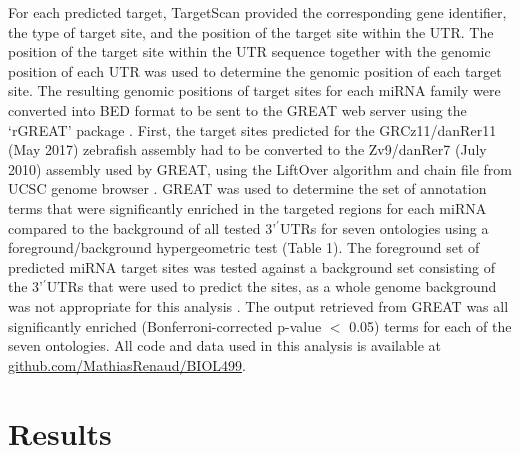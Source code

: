 \documentclass[12pt]{article}
\begin{document}
For each predicted target, TargetScan provided the corresponding gene identifier, the type of target site, and the position of the target site within the UTR. The position of the target site within the UTR sequence together with the genomic position of each UTR was used to determine the genomic position of each target site. The resulting genomic positions of target sites for each miRNA family were converted into BED format to be sent to the GREAT web server using the ‘rGREAT’ package \cite{gu2018}. First, the target sites predicted for the GRCz11/danRer11 (May 2017) zebrafish assembly had to be converted to the Zv9/danRer7 (July 2010) assembly used by GREAT, using the LiftOver algorithm and chain file from UCSC genome browser \cite{karolchik2003ucsc}. GREAT was used to determine the set of annotation terms that were significantly enriched in the targeted regions for each miRNA compared to the background of all tested 3’$^\prime$UTRs for seven ontologies using a foreground/background hypergeometric test (Table 1). The foreground set of predicted miRNA target sites was tested against a background set consisting of the 3’$^\prime$UTRs that were used to predict the sites, as a whole genome background was not appropriate for this analysis \cite{rhee2008use}. The output retrieved from GREAT was all significantly enriched (Bonferroni-corrected p-value $<$ 0.05) terms for each of the seven ontologies. All code and data used in this analysis is available at \url{github.com/MathiasRenaud/BIOL499}.

\section{   Results}
\end{document}

